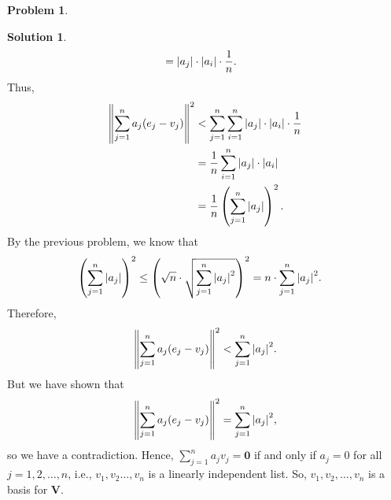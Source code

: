 \documentclass{article}
\theoremstyle{definition}
\newtheorem*{prob*}{Problem}
\newtheorem*{sln*}{Solution}
\newcommand{\V}{\mathbf{V}}
\begin{document}
\begin{prob*}
\begin{enumerate}
\begin{sln*}
\begin{align*}
			&= \abs{a_j}\cdot \abs{a_i}\cdot \frac{1}{n}.
			\end{align*}
			Thus,
			\begin{align*}
			\norm{\sum^n_{j=1} a_j(e_j - v_j)}^2
			&< \sum^n_{j=1}\sum^n_{i=1} \abs{a_j}\cdot \abs{a_i}\cdot \frac{1}{n}\\
			&= \frac{1}{n}\sum^n_{i=1} \abs{a_j}\cdot \abs{a_i}\\
			&= \frac{1}{n}\left( \sum^n_{j=1}\vert a_j\vert \right)^2.
			\end{align*}
			By the previous problem, we know that
			\begin{align*}
			\left( \sum^n_{j=1}\vert a_j\vert \right)^2 
			&\leq \left( \sqrt{n}\cdot \sqrt{\sum^n_{j=1}\abs{a_j}^2 } \right)^2
			= n\cdot \sum^n_{j=1}\abs{a_j}^2.
			\end{align*}
			Therefore,
			\begin{align*}
			\norm{\sum^n_{j=1} a_j(e_j - v_j)}^2 < \sum^n_{j=1}\abs{a_j}^2.
			\end{align*}
			But we have shown that
			\begin{align*}
			\norm{\sum^n_{j=1} a_j(e_j - v_j)}^2 = \sum^n_{j=1}\abs{a_j}^2,
			\end{align*}
			so we have a contradiction. Hence, $\sum^n_{j=1}a_jv_j = \mathbf{0}$ if and only if $a_j = 0$ for all $j=1,2,\dots,n$, i.e., $v_1,v_2\dots,v_n$ is a linearly independent list. So, $v_1, v_2,\dots,v_n$ is a basis for $\V$.
		\end{sln*}
	\end{enumerate}
	
\end{prob*}




\newpage
\end{document}
